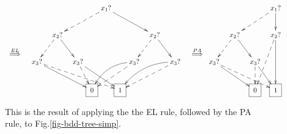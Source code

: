 \begin{figure}[h!]
$$
\xymatrix{
\\\\
\stackrel{EL}{\implies}}
\xymatrix@C=.1pc{
&&&&&&&x_1?\ar@{-->}[dllll]
\ar[drrrr]
\\
&&&x_2?\ar@{-->}[dll]\ar[drr]
&&&&&&&&x_2?\ar@{-->}[dll]\ar[drr]
\\
&x_3?\ar@{-->}[drrrrrrr]\ar[drrrrr]
&&&&x_3?\ar@{-->}[dr]\ar[drrr]
&&&&x_3?\ar@{-->}[dlll]\ar@/_1pc/[dlll]
&&&&x_3?\ar@{-->}[dlllll]\ar@/_1pc/[dlllll]
\\
&&
&&
&&\Rect{0}
&&\Rect{1}
&&
&&
&&
}
\xymatrix{
\\\\\stackrel{PA}{\implies}}
\xymatrix@C=.1pc{
&&&&&&x_1?\ar@{-->}[dllll]
\ar[d]
\\
&&x_2?\ar@{-->}[dll]\ar[drr]
&&&&x_2?\ar@{-->}[ddll]\ar[dd]
\\
x_3?\ar@{-->}[drrrrrr]\ar[drrrr]
&&&&x_3?\ar@{-->}[d]\ar[drr]
\\
&&
&&\Rect{0}
&&\Rect{1}
&&
&&
&&
}
$$
\caption{This is the 
result of applying the
the EL rule, followed by the PA
rule, to Fig.\ref{fig-bdd-tree-simp}.}
\label{fig-el-pa-example}
\end{figure}


